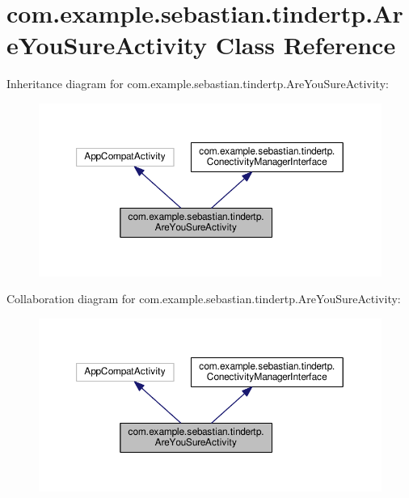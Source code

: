 \hypertarget{classcom_1_1example_1_1sebastian_1_1tindertp_1_1AreYouSureActivity}{}\section{com.\+example.\+sebastian.\+tindertp.\+Are\+You\+Sure\+Activity Class Reference}
\label{classcom_1_1example_1_1sebastian_1_1tindertp_1_1AreYouSureActivity}


Inheritance diagram for com.\+example.\+sebastian.\+tindertp.\+Are\+You\+Sure\+Activity\+:\nopagebreak
\begin{figure}[H]
\begin{center}
\leavevmode
\includegraphics[width=350pt]{classcom_1_1example_1_1sebastian_1_1tindertp_1_1AreYouSureActivity__inherit__graph}
\end{center}
\end{figure}


Collaboration diagram for com.\+example.\+sebastian.\+tindertp.\+Are\+You\+Sure\+Activity\+:\nopagebreak
\begin{figure}[H]
\begin{center}
\leavevmode
\includegraphics[width=350pt]{classcom_1_1example_1_1sebastian_1_1tindertp_1_1AreYouSureActivity__coll__graph}
\end{center}
\end{figure}
